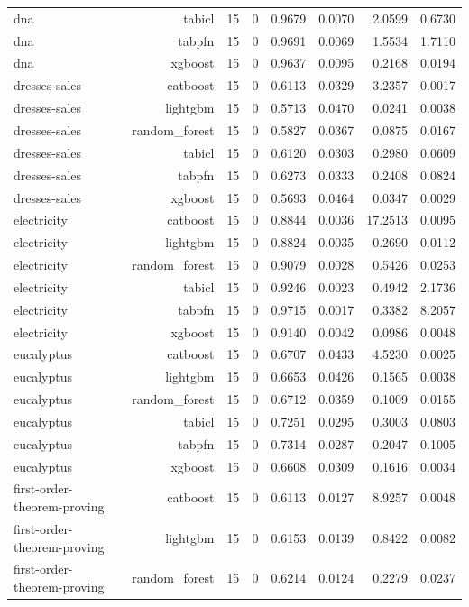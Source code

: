 \begin{table}[htbp]
\begin{tabular}{lrrrrrrr}
dna & tabicl & 15 & 0 & 0.9679 & 0.0070 & 2.0599 & 0.6730 \\
dna & tabpfn & 15 & 0 & 0.9691 & 0.0069 & 1.5534 & 1.7110 \\
dna & xgboost & 15 & 0 & 0.9637 & 0.0095 & 0.2168 & 0.0194 \\
dresses-sales & catboost & 15 & 0 & 0.6113 & 0.0329 & 3.2357 & 0.0017 \\
dresses-sales & lightgbm & 15 & 0 & 0.5713 & 0.0470 & 0.0241 & 0.0038 \\
dresses-sales & random\_forest & 15 & 0 & 0.5827 & 0.0367 & 0.0875 & 0.0167 \\
dresses-sales & tabicl & 15 & 0 & 0.6120 & 0.0303 & 0.2980 & 0.0609 \\
dresses-sales & tabpfn & 15 & 0 & 0.6273 & 0.0333 & 0.2408 & 0.0824 \\
dresses-sales & xgboost & 15 & 0 & 0.5693 & 0.0464 & 0.0347 & 0.0029 \\
electricity & catboost & 15 & 0 & 0.8844 & 0.0036 & 17.2513 & 0.0095 \\
electricity & lightgbm & 15 & 0 & 0.8824 & 0.0035 & 0.2690 & 0.0112 \\
electricity & random\_forest & 15 & 0 & 0.9079 & 0.0028 & 0.5426 & 0.0253 \\
electricity & tabicl & 15 & 0 & 0.9246 & 0.0023 & 0.4942 & 2.1736 \\
electricity & tabpfn & 15 & 0 & 0.9715 & 0.0017 & 0.3382 & 8.2057 \\
electricity & xgboost & 15 & 0 & 0.9140 & 0.0042 & 0.0986 & 0.0048 \\
eucalyptus & catboost & 15 & 0 & 0.6707 & 0.0433 & 4.5230 & 0.0025 \\
eucalyptus & lightgbm & 15 & 0 & 0.6653 & 0.0426 & 0.1565 & 0.0038 \\
eucalyptus & random\_forest & 15 & 0 & 0.6712 & 0.0359 & 0.1009 & 0.0155 \\
eucalyptus & tabicl & 15 & 0 & 0.7251 & 0.0295 & 0.3003 & 0.0803 \\
eucalyptus & tabpfn & 15 & 0 & 0.7314 & 0.0287 & 0.2047 & 0.1005 \\
eucalyptus & xgboost & 15 & 0 & 0.6608 & 0.0309 & 0.1616 & 0.0034 \\
first-order-theorem-proving & catboost & 15 & 0 & 0.6113 & 0.0127 & 8.9257 & 0.0048 \\
first-order-theorem-proving & lightgbm & 15 & 0 & 0.6153 & 0.0139 & 0.8422 & 0.0082 \\
first-order-theorem-proving & random\_forest & 15 & 0 & 0.6214 & 0.0124 & 0.2279 & 0.0237 \\

\end{tabular}
\end{table}
